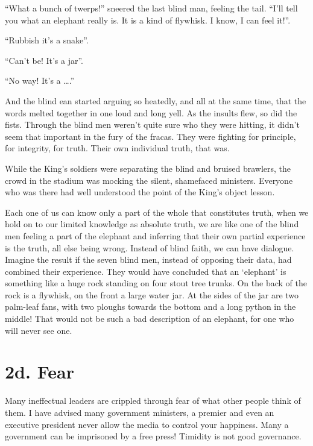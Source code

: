 \documentclass[12pt, openany]{book}
\begin{document}
“What a bunch of twerps!” sneered the last blind man, feeling the tail. “I’ll tell you what an elephant really is. It is a kind of flywhisk. I know, I can feel it!”.

“Rubbish it’s a snake”.

“Can’t be! It’s a jar”.

“No way! It’s a ….”

And the blind ean started arguing so heatedly, and all at the same time, that the words melted together in one loud and long yell. As the insults flew, so did the fists. Through the blind men weren’t quite sure who they were hitting, it didn’t seem that important in the fury of the fracas. They were fighting for principle, for integrity, for truth. Their own individual truth, that was.

While the King’s soldiers were separating the blind and bruised brawlers, the crowd in the stadium was mocking the silent, shamefaced ministers. Everyone who was there had well understood the point of the King’s object lesson.

Each one of us can know only a part of the whole that constitutes truth, when we hold on to our limited knowledge as absolute truth, we are like one of the blind men feeling a part of the elephant and inferring that their own partial experience is the truth, all else being wrong. Instead of blind faith, we can have dialogue. Imagine the result if the seven blind men, instead of opposing their data, had combined their experience. They would have concluded that an ‘elephant’ is something like a huge rock standing on four stout tree trunks. On the back of the rock is a flywhisk, on the front a large water jar. At the sides of the jar are two palm-leaf fans, with two ploughs towards the bottom and a long python in the middle! That would not be such a bad description of an elephant, for one who will never see one.

\section{2d. Fear}

Many ineffectual leaders are crippled through fear of what other people think of them. I have advised many government ministers, a premier and even an executive president never allow the media to control your happiness. Many a government can be imprisoned by a free press! Timidity is not good governance.
\end{document}
